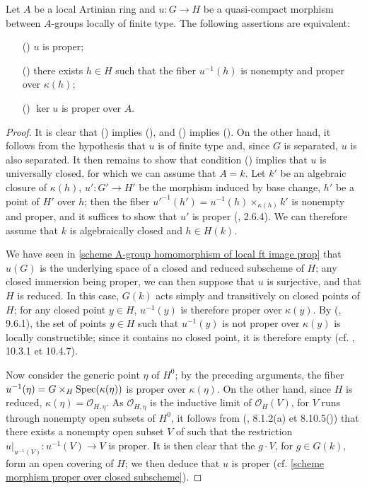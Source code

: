 \begin{proposition}\label{scheme alg group morphism proper iff}
Let $A$ be a local Artinian ring and $u:G\to H$ be a quasi-compact morphism between $A$-groups locally of finite type. The following assertions are equivalent:
\begin{enumerate}
    \item[(\rmnum{1})] $u$ is proper;
    \item[(\rmnum{2})] there exists $h\in H$ such that the fiber $u^{-1}(h)$ is nonempty and proper over $\kappa(h)$;
    \item[(\rmnum{2})] $\ker u$ is proper over $A$.
\end{enumerate}
\end{proposition}
\begin{proof}
It is clear that () implies (), and () implies (). On the other hand, it follows from the hypothesis that $u$ is of finite type and, since $G$ is separated, $u$ is also separated. It then remains to show that condition () implies that $u$ is universally closed, for which we can assume that $A=k$. Let $k'$ be an algebraic closure of $\kappa(h)$, $u':G'\to H'$ be the morphism induced by base change, $h'$ be a point of $H'$ over $h$; then the fiber $u'^{-1}(h')=u^{-1}(h)\times_{\kappa(h)}k'$ is nonempty and proper, and it suffices to show that $u'$ is proper (\cite{EGA4-2}, 2.6.4). We can therefore assume that $k$ is algebraically closed and $h\in H(k)$.\par
We have seen in \cref{scheme A-group homomorphism of local ft image prop} that $u(G)$ is the underlying space of a closed and reduced subscheme of $H$; any closed immersion being proper, we can then suppose that $u$ is surjective, and that $H$ is reduced. In this case, $G(k)$ acts simply and transitively on closed points of $H$; for any closed point $y\in H$, $u^{-1}(y)$ is therefore proper over $\kappa(y)$. By (\cite{EGA4-3}, 9.6.1), the set of points $y\in H$ such that $u^{-1}(y)$ is not proper over $\kappa(y)$ is locally constructible; since it contains no closed point, it is therefore empty (cf. \cite{EGA4-3}, 10.3.1 et 10.4.7).\par
Now consider the generic point $\eta$ of $H^0$; by the preceding arguments, the fiber $u^{-1}(\eta)=G\times_H\mathrm{Spec}(\kappa(\eta))$ is proper over $\kappa(\eta)$. On the other hand, since $H$ is reduced, $\kappa(\eta)=\mathscr{O}_{H,\eta}$. As $\mathscr{O}_{H,\eta}$ is the inductive limit of $\mathscr{O}_H(V)$, for $V$ runs through nonempty open subsets of $H^0$, it follows from (\cite{EGA4-3}, 8.1.2(a) et 8.10.5()) that there exists a nonempty open subset $V$ of such that the restriction $u|_{u^{-1}(V)}:u^{-1}(V)\to V$ is proper. It is then clear that the $g\cdot V$, for $g\in G(k)$, form an open covering of $H$; we then deduce that $u$ is proper (cf. \cref{scheme morphism proper over closed subscheme}).
\end{proof}

